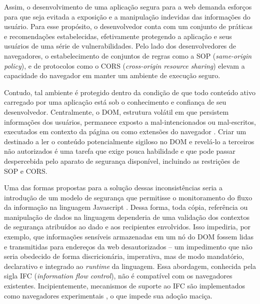 Assim, o desenvolvimento de uma aplicação segura para a web demanda esforços para que seja evitada a exposição e a manipulação indevidas das informações do usuário. Para esse propósito, o desenvolvedor conta com um conjunto de práticas e recomendações estabelecidas, efetivamente protegendo a aplicação e seus usuários de uma série de vulnerabilidades. Pelo lado dos desenvolvedores de navegadores, o estabelecimento de conjuntos de regras como a SOP (\textit{same-origin policy}), e de protocolos como o CORS (\textit{cross-origin resource sharing}) elevam a capacidade do navegador em manter um ambiente de execução seguro.%

Contudo, tal ambiente é protegido dentro da condição de que todo conteúdo ativo carregado por uma aplicação está sob o conhecimento e confiança de seu desenvolvedor. Centralmente, o DOM, estrutura volátil em que persistem informações dos usuários, permanece exposto a {\scripts} mal-intencionados ou mal-escritos, executados em contexto da página ou como extensões do navegador \cite{Heule2015_Most_Dangerous_Code}. Criar um {\script} destinado a ler o conteúdo potencialmente sigiloso no DOM e revelá-lo a terceiros não autorizados é uma tarefa que exige pouca habilidade e que pode passar despercebida pelo aparato de segurança disponível, incluindo as restrições de SOP e CORS.

Uma das formas propostas para a solução dessas inconsistências seria a introdução de um modelo de segurança que permitisse o monitoramento do fluxo da informação na linguagem Javascript \cite[p.3]{Heule2015_IFC_Inside}. Dessa forma, toda cópia, referência ou manipulação de dados na linguagem dependeria de uma validação dos contextos de segurança atribuídos ao dado e aos recipientes envolvidos. Isso impediria, por exemplo, que informações sensíveis armazenadas em um nó do DOM fossem lidas e transmitidas para endereços da web desautorizados -- um impedimento que não seria obedecido de forma discricionária, imperativa, mas de modo mandatório, declarativo e integrado ao \textit{runtime} da linguagem. Essa abordagem, conhecida pela sigla IFC (\textit{information flow control}), não é compatível com os navegadores existentes. Incipientemente, mecanismos de suporte ao IFC são implementados como navegadores experimentais \cite{Hedin2014, Bichhawat2014}, o que impede sua adoção maciça.

